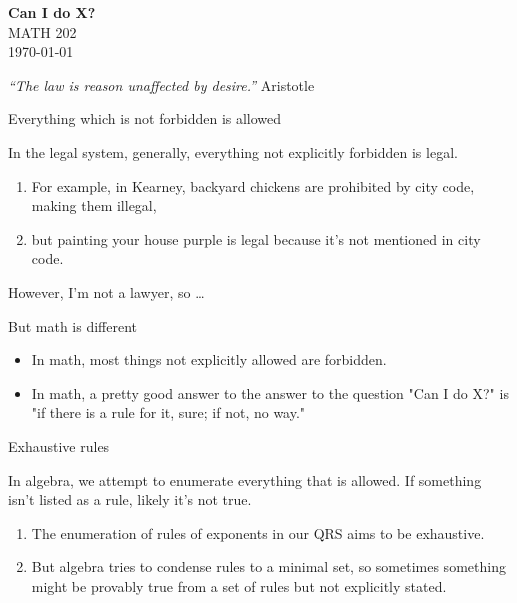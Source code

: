 \documentclass[portrait,fleqn,12pt]{beamer}
\newenvironment{handlist}
   {\begin{enumerate}[\faHandPointRight]
       \addtolength{\itemsep}{0.0\itemsep}}
     {\end{enumerate}}
\begin{document}
\begin{frame}
\begin{flushleft} 
\textbf{Can I do X?} \\
MATH 202 \\
\today 
\end{flushleft}


\emph{“The law is reason unaffected by desire.”} \hfill {\sc Aristotle } 
\end{frame}


\begin{frame}[fragile]{Everything which is not forbidden is allowed}

In the legal system, generally, everything not explicitly forbidden is legal.  

\begin{handlist}
 \item For example, in Kearney, backyard chickens are prohibited by city code, making them illegal, 
 
 \item but painting your house purple is legal because it's not mentioned in city code.
 \end{handlist}
 
 However, I'm not a lawyer, so \dots
\end{frame}
 
\begin{frame}{But math is different}
 
\begin{itemize}
\item[\faHandPointRight] In math, most things not explicitly allowed are forbidden.
\item[\faHandPointRight] In math, a pretty good answer to the answer to the question "Can I do X?"  is "if there is a rule for it, sure; if not, no way."
\end{itemize}
 \vfill
\end{frame}

\begin{frame}{Exhaustive rules}

In algebra, we attempt to enumerate everything that is allowed. If something isn't listed as a rule, likely it's not true.

\begin{handlist}
\item The enumeration of rules of exponents in our QRS aims to be exhaustive.

\item  But algebra tries to condense rules to a minimal set, so sometimes something might be provably true from a set of rules but not explicitly stated.
\end{handlist}

\end{frame}
\end{document}

